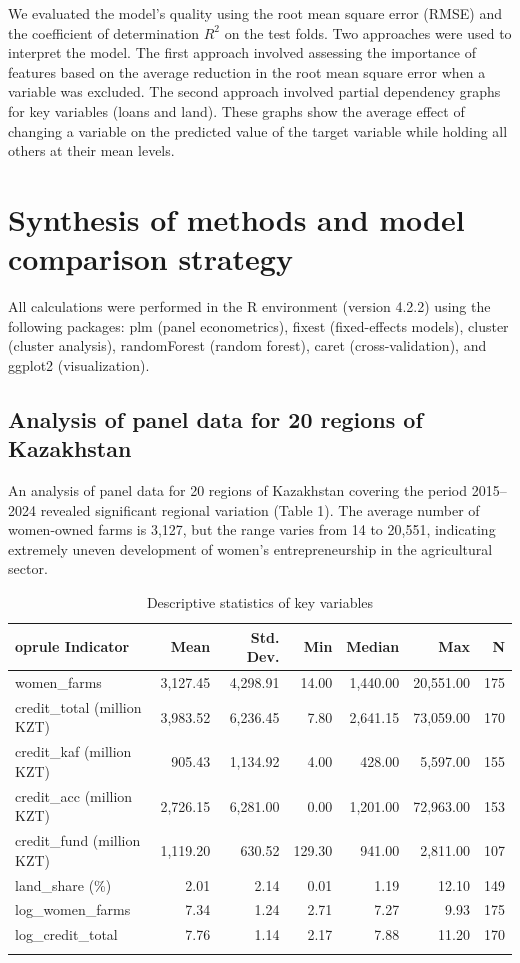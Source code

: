 ﻿\documentclass[pdflatex,sn-mathphys-ay]{sn-jnl}
\begin{document}
We evaluated the model's quality using the root mean square error (RMSE)
and the coefficient of determination $R^2$ on the test folds. Two
approaches were used to interpret the model. The first approach involved
assessing the importance of features based on the average reduction in
the root mean square error when a variable was excluded. The second
approach involved partial dependency graphs for key variables (loans and
land). These graphs show the average effect of changing a variable on
the predicted value of the target variable while holding all others at
their mean levels.

\section{Synthesis of methods and model comparison strategy}

All calculations were performed in the R environment (version 4.2.2)
using the following packages: plm (panel econometrics), fixest
(fixed-effects models), cluster (cluster analysis), randomForest (random
forest), caret (cross-validation), and ggplot2 (visualization).

\subsection{Analysis of panel data for 20 regions of Kazakhstan}

An analysis of panel data for 20 regions of Kazakhstan covering the
period 2015--2024 revealed significant regional variation (Table 1). The
average number of women-owned farms is 3,127, but the range varies from
14 to 20,551, indicating extremely uneven development of women's
entrepreneurship in the agricultural sector.

\begin{table}[htbp]
\caption{Descriptive statistics of key variables}\label{tab:descriptive}
\small
\begin{tabular*}{\textwidth}{@{\extracolsep{\fill}}p{}rrrrrr@{}}
	oprule
Indicator & Mean & Std. Dev. & Min & Median & Max & N\\
\midrule
women\_farms & 3,127.45 & 4,298.91 & 14.00 & 1,440.00 & 20,551.00 & 175\\
credit\_total (million KZT) & 3,983.52 & 6,236.45 & 7.80 & 2,641.15 & 73,059.00 & 170\\
credit\_kaf (million KZT) & 905.43 & 1,134.92 & 4.00 & 428.00 & 5,597.00 & 155\\
credit\_acc (million KZT) & 2,726.15 & 6,281.00 & 0.00 & 1,201.00 & 72,963.00 & 153\\
credit\_fund (million KZT) & 1,119.20 & 630.52 & 129.30 & 941.00 & 2,811.00 & 107\\
land\_share (\%) & 2.01 & 2.14 & 0.01 & 1.19 & 12.10 & 149\\
log\_women\_farms & 7.34 & 1.24 & 2.71 & 7.27 & 9.93 & 175\\
log\_credit\_total & 7.76 & 1.14 & 2.17 & 7.88 & 11.20 & 170\\
\botrule
\end{tabular*}
\end{table}
\end{document}
